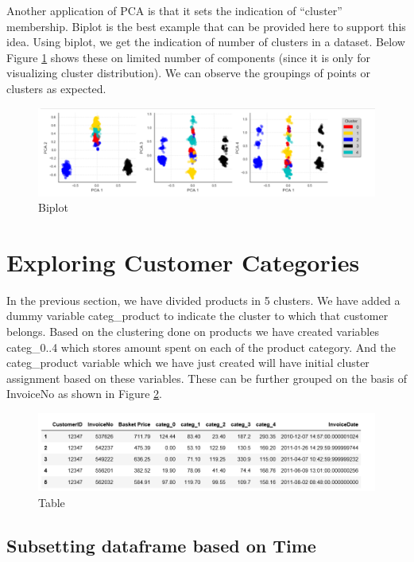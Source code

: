 Another application of PCA is that it sets the indication of “cluster” membership. Biplot is the best example that can be provided here to support this idea. Using biplot, we get the indication of number of clusters in a dataset. Below Figure \ref{3.6} shows these on limited number of components (since it is only for visualizing cluster distribution). We can observe the groupings of points or clusters as expected.\\

\begin{figure}
\caption{Biplot}
\label{3.6}
\centering
\includegraphics[width=\columnwidth]{images/3_6.PNG}
\end{figure}

\section{Exploring Customer Categories}


In the previous section, we have divided products in 5 clusters. We have added a dummy variable categ\_product to indicate the cluster to which that customer belongs. Based on the clustering done on products we have created variables categ\_0..4 which stores amount spent on each of the product category. And the categ\_product variable which we have just created will have initial cluster assignment based on these variables. These can be further grouped on the basis of InvoiceNo as shown in Figure \ref{4.1}.\\

\begin{figure}
\caption{Table}
\label{4.1}
\centering
\includegraphics[width=\columnwidth]{images/4_1.PNG}
\end{figure}


\subsection{Subsetting dataframe based on Time}


